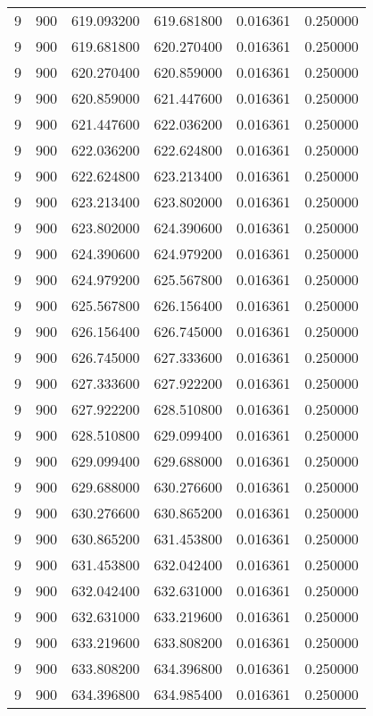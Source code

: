 \begin{longtable}{rrrrrr}
9 & 900 & 619.093200 & 619.681800 & 0.016361 & 0.250000 \\
9 & 900 & 619.681800 & 620.270400 & 0.016361 & 0.250000 \\
9 & 900 & 620.270400 & 620.859000 & 0.016361 & 0.250000 \\
9 & 900 & 620.859000 & 621.447600 & 0.016361 & 0.250000 \\
9 & 900 & 621.447600 & 622.036200 & 0.016361 & 0.250000 \\
9 & 900 & 622.036200 & 622.624800 & 0.016361 & 0.250000 \\
9 & 900 & 622.624800 & 623.213400 & 0.016361 & 0.250000 \\
9 & 900 & 623.213400 & 623.802000 & 0.016361 & 0.250000 \\
9 & 900 & 623.802000 & 624.390600 & 0.016361 & 0.250000 \\
9 & 900 & 624.390600 & 624.979200 & 0.016361 & 0.250000 \\
9 & 900 & 624.979200 & 625.567800 & 0.016361 & 0.250000 \\
9 & 900 & 625.567800 & 626.156400 & 0.016361 & 0.250000 \\
9 & 900 & 626.156400 & 626.745000 & 0.016361 & 0.250000 \\
9 & 900 & 626.745000 & 627.333600 & 0.016361 & 0.250000 \\
9 & 900 & 627.333600 & 627.922200 & 0.016361 & 0.250000 \\
9 & 900 & 627.922200 & 628.510800 & 0.016361 & 0.250000 \\
9 & 900 & 628.510800 & 629.099400 & 0.016361 & 0.250000 \\
9 & 900 & 629.099400 & 629.688000 & 0.016361 & 0.250000 \\
9 & 900 & 629.688000 & 630.276600 & 0.016361 & 0.250000 \\
9 & 900 & 630.276600 & 630.865200 & 0.016361 & 0.250000 \\
9 & 900 & 630.865200 & 631.453800 & 0.016361 & 0.250000 \\
9 & 900 & 631.453800 & 632.042400 & 0.016361 & 0.250000 \\
9 & 900 & 632.042400 & 632.631000 & 0.016361 & 0.250000 \\
9 & 900 & 632.631000 & 633.219600 & 0.016361 & 0.250000 \\
9 & 900 & 633.219600 & 633.808200 & 0.016361 & 0.250000 \\
9 & 900 & 633.808200 & 634.396800 & 0.016361 & 0.250000 \\
9 & 900 & 634.396800 & 634.985400 & 0.016361 & 0.250000 \\

\end{longtable}
